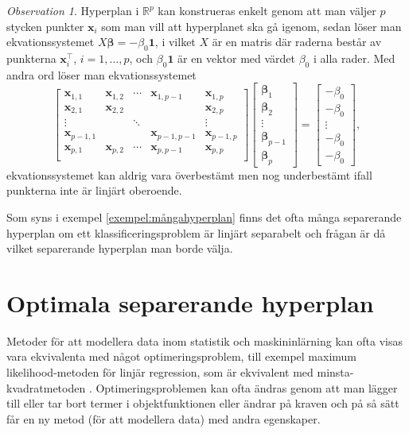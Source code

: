 \documentclass[a4paper, 12pt]{report}
\theoremstyle{definition}
\theoremstyle{remark}
\newtheorem*{rem}{Observation}
\newcommand{\bfbeta}{{\boldsymbol{\beta}}}
\newcommand{\bfx}{\mathbf{x}}
\begin{document}
\begin{rem}
	Hyperplan i $\mathbb{R}^p$ kan konstrueras enkelt genom att man väljer $p$ stycken punkter $\mathbf{x}_i$ som man vill att hyperplanet ska gå igenom, sedan löser man ekvationssystemet $X\bfbeta=-\beta_0\mathbf{1}$, i vilket $X$ är en matris där raderna består av punkterna $\mathbf{x}_i^\intercal$, $i=1,\dots, p$, och $\beta_0\mathbf{1}$ är en vektor med värdet $\beta_0$ i alla rader.
	Med andra ord löser man ekvationssystemet
	\begin{equation*}
		\begin{bmatrix}
		\bfx_{1,1}	& \bfx_{1,2}	& \cdots	& \bfx_{1,p-1}	& \bfx_{1,p}\\
		\bfx_{2,1}	& \bfx_{2,2}	&  			& 				& \bfx_{2,p}\\
		\vdots		&				& \ddots	&				& \vdots\\
		\bfx_{p-1,1}& 				&  			& \bfx_{p-1,p-1}	&\bfx_{p-1,p}\\
		\bfx_{p,1}	& \bfx_{p,2}	& \cdots	& \bfx_{p,p-1}	& \bfx_{p,p}\\
		\end{bmatrix}
		\begin{bmatrix}
		\bfbeta_1\\ \bfbeta_2\\\vdots\\\bfbeta_{p-1}\\\bfbeta_{p}
		\end{bmatrix}=
		\begin{bmatrix}
		-\beta_0\\-\beta_0\\\vdots\\-\beta_0\\-\beta_0
		\end{bmatrix},
	\end{equation*}
	ekvationssystemet kan aldrig vara överbestämt men nog underbestämt ifall punkterna inte är linjärt oberoende.
\end{rem}

Som syns i exempel \ref{exempel:mångahyperplan} finns det ofta många separerande hyperplan om ett klassificeringsproblem är linjärt separabelt och frågan är då vilket separerande hyperplan man borde välja.

\section{Optimala separerande hyperplan}
Metoder för att modellera data inom statistik och maskininlärning kan ofta visas vara ekvivalenta med något optimeringsproblem, till exempel maximum likelihood-metoden för linjär regression, som är ekvivalent med minsta-kvadratmetoden \cite{MLEOLS}.
Optimeringsproblemen kan ofta ändras genom att man lägger till eller tar bort termer i objektfunktionen eller ändrar på kraven och på så sätt får en ny metod (för att modellera data) med andra egenskaper.
\end{document}
